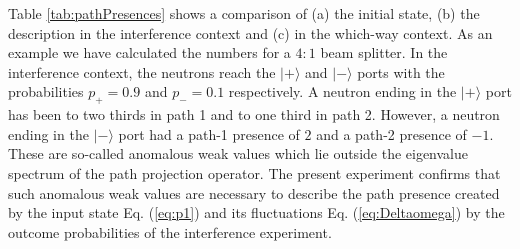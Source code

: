 \documentclass[english,keywords,aps,twocolumn]{revtex4-1}
\begin{document}
Table \ref{tab:pathPresences} shows a comparison of (a) the initial state, (b) the description in the interference context and (c) in the which-way context. As an example we have calculated the numbers for a $4:1$ beam splitter. In the interference context, the neutrons reach the $|+\rangle$ and $|-\rangle$ ports with the probabilities $p_+=0.9$ and $p_-=0.1$ respectively. A neutron ending in the $|+\rangle$ port has been to two thirds in path 1 and to one third in path 2. However, a neutron ending in the $|-\rangle$ port had a path-1 presence of $2$ and a path-2 presence of $-1$. 
These are so-called anomalous weak values which lie outside the eigenvalue spectrum of the path projection operator. The present experiment confirms that such anomalous weak values are necessary \cite{Hosoya10,Pusey14} to describe the path presence created by the input state Eq. (\ref{eq:p1}) and its fluctuations Eq. (\ref{eq:Deltaomega}) by the outcome probabilities of the interference experiment.
\end{document}
